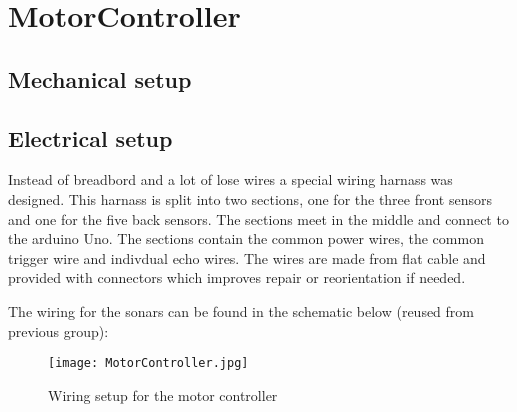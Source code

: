 \section{MotorController}


\subsection{Mechanical setup}


\subsection{Electrical setup}
Instead of breadbord and a lot of lose wires a special wiring harnass was designed. 
This harnass is split into two sections, one for the three front sensors and one for the five back sensors.
The sections meet in the middle and connect to the arduino Uno.
The sections contain the common power wires, the common trigger wire and indivdual echo wires.
The wires are made from flat cable and provided with connectors which improves repair or reorientation if needed.

The wiring for the sonars can be found in the schematic below (reused from previous group):

\begin{figure}[H]
\centering
\texttt{[image: MotorController.jpg]}
\caption{Wiring setup for the motor controller}
\label{fig::wiringMotor}
\end{figure}

 
    